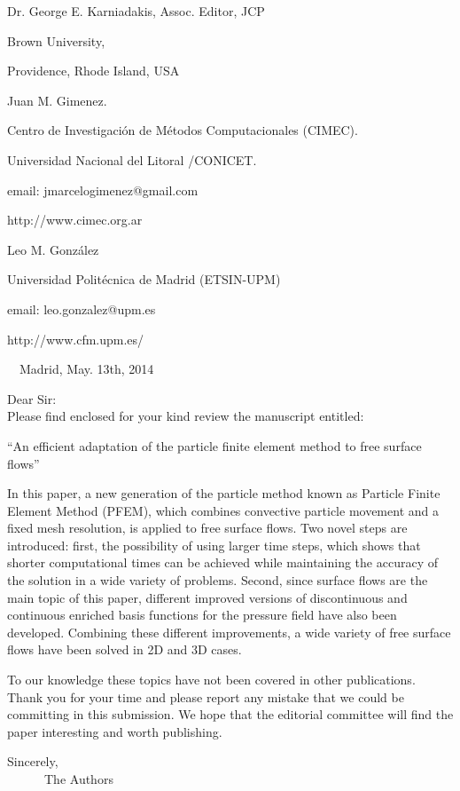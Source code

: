 \documentclass[a4paper,12pt]{article}
\newcommand{\rc}{\\[0.1 in]}
\begin{document}
\thispagestyle{empty}
%
\noindent Dr. George E. Karniadakis, Assoc. Editor, JCP  

Brown University, 

Providence, Rhode Island, USA$$$$


\hspace{6cm}Juan M. Gimenez.

\hspace{6cm}Centro de Investigaci\'on de M\'etodos Computacionales (CIMEC).

\hspace{6cm}Universidad Nacional del Litoral /CONICET.

\hspace{6cm}email: jmarcelogimenez@gmail.com

\hspace{6cm}http://www.cimec.org.ar

\hspace{6cm}

\hspace{6cm}Leo M. Gonz\'{a}lez

\hspace{6cm}Universidad Polit\'{e}cnica de Madrid (ETSIN-UPM)

\hspace{6cm}email: leo.gonzalez@upm.es

\hspace{6cm}http://www.cfm.upm.es/

\vspace{2cm}

$\quad$\hspace{10cm}Madrid, May. 13th, 2014
$$$$

\noindent Dear Sir:\rc
%
Please find enclosed for your kind review the manuscript entitled:
%
\begin{center}
``An efficient adaptation of the particle finite element method to free surface flows''
\end{center}
%
In this paper, a new generation of the particle method known as Particle Finite
 Element Method (PFEM), which combines convective particle movement and a fixed 
 mesh resolution, is applied to free surface flows. Two novel steps are introduced: first, 
 the possibility of using larger time steps, which shows that shorter computational times 
 can be achieved while maintaining the accuracy of the solution in a wide variety of problems. 
 Second, since surface flows are the main topic of this paper, different improved versions of 
 discontinuous and continuous enriched basis functions for the pressure field have also been developed. 
 Combining these different improvements, a wide variety of free surface flows have been solved in 2D and 3D cases.

%
To our knowledge these topics have not been covered in other publications.
%
%
Thank you for your time and please report any mistake that we could be
committing in this submission.
%
We hope that the editorial committee will find the paper interesting and worth
publishing.

%
$$$$
Sincerely,
$$$$
$\quad$$\quad$$\quad$The Authors
$$\quad$$
%
% 
\end{document}
